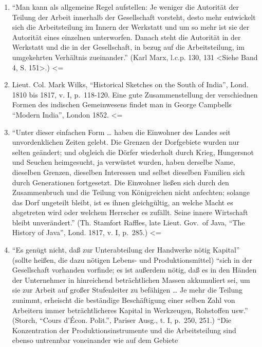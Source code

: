 {\begin{enumerate}
\def\labelenumi{(\arabic{enumi})}
\setcounter{enumi}{58}
\item
  ``Man kann als allgemeine Regel aufstellen: Je weniger die Autorität
  der Teilung der Arbeit innerhalb der Gesellschaft vorsteht, desto mehr
  entwickelt sich die Arbeitsteilung im Innern der Werkstatt und um so
  mehr ist sie der Autorität eines einzelnen unterworfen. Danach steht
  die Autorität in der Werkstatt und die in der Gesellschaft, in bezug
  auf die Arbeitsteilung, im umgekehrten Verhältnis zueinander.'' (Karl
  Marx, l.c.p. 130, 131 \textless{}Siehe Band 4, S. 151\textgreater{}.)
  \textless{}=
\item
  Lieut. Col. Mark Wilks, ``Historical Sketches on the South of India'',
  Lond. 1810 bis 1817, v. I, p.~118-120. Eine gute Zusammenstellung der
  verschiednen Formen des indischen Gemeinwesens findet man in George
  Campbells ``Modern India'', London 1852. \textless{}=
\item
  ``Unter dieser einfachen Form \ldots{} haben die Einwohner des Landes
  seit unvordenklichen Zeiten gelebt. Die Grenzen der Dorfgebiete wurden
  nur selten geändert; und obgleich die Dörfer wiederholt durch Krieg,
  Hungersnot und Seuchen heimgesucht, ja verwüstet wurden, haben
  derselbe Name, dieselben Grenzen, dieselben Interessen und selbst
  dieselben Familien sich durch Generationen fortgesetzt. Die Einwohner
  ließen sich durch den Zusammenbruch und die Teilung von Königreichen
  nicht anfechten; solange das Dorf ungeteilt bleibt, ist es ihnen
  gleichgültig, an welche Macht es abgetreten wird oder welchem
  Herrscher es zufällt. Seine innere Wirtschaft bleibt unverändert.''
  (Th. Stamfort Raffles, late Lieut. Gov.~of Java, ``The History of
  Java'', Lond. 1817, v. I, p.~285.) \textless{}=
\item
  ``Es genügt nicht, daß zur Unterabteilung der Handwerke nötig
  Kapital'' (sollte heißen, die dazu nötigen Lebens- und
  Produktionsmittel) ``sich in der Gesellschaft vorhanden vorfinde; es
  ist außerdem nötig, daß es in den Händen der Unternehmer in
  hinreichend beträchtlichen Massen akkumuliert sei, um sie zur Arbeit
  auf großer Stufenleiter zu befähigen \ldots{} Je mehr die Teilung
  zunimmt, erheischt die beständige Beschäftigung einer selben Zahl von
  Arbeitern immer beträchtlicheres Kapital in Werkzeugen, Rohstoffen
  usw.'' (Storch, ``Cours d'Écon. Polit.'', Pariser Ausg., t. I, p.~250,
  251.) ``Die Konzentration der Produktionsinstrumente und die
  Arbeitsteilung sind ebenso untrennbar voneinander wie auf dem Gebiete

\end{enumerate}}

